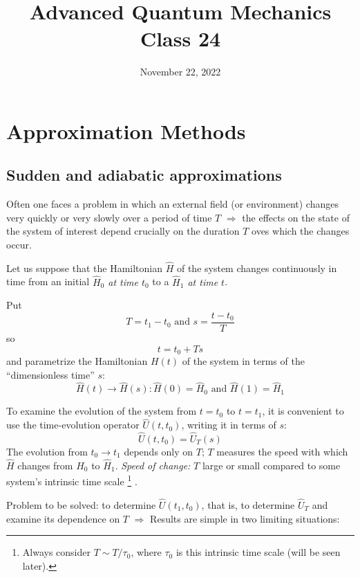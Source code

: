 \documentclass[12pt]{article}
\title{Advanced Quantum Mechanics\\Class 24}
\date{November 22, 2022}                                           %
\newcommand{\be}{\begin{equation}}
\newcommand{\ee}{\end{equation}}
\begin{document}
\maketitle

\setcounter{section}{6}

\section{Approximation Methods}


\setcounter{subsection}{2}
\subsection{Sudden and adiabatic approximations}

Often one faces a problem in which an
external field (or environment) changes
very quickly or very slowly over a
period of time $T$
$\Rightarrow$
the effects on the state of the system of
interest depend crucially on the
duration $T$ oves which the changes occur.

Let us suppose that the Hamiltonian $\hat{H}$ of the
system changes continuously in time from an
initial \emph{$\hat{H}_{0}$ at time $t_{0}$} to a \emph{$\hat{H}_{1}$ at time $t$}.

Put
\be
T=t_{1}-t_{0} \text { and } s=\frac{t-t_{0}}{T}
\ee
so
\be
t = t_0  +Ts
\ee
and parametrize the Hamiltonian $H(t)$ of the system
in terms of the ``dimensionless time'' $s$:
\be
\hat{H}(t) \rightarrow \hat{H}(s): \hat{H}(0)=\hat{H}_{0} \text{ and } \hat{H}(1)=\hat{H}_{1}
\ee


To examine the evolution of the system from $t=t_{0}$
to $t=t_{1}$, it is convenient to use the time-evolution
operator $\hat{U}\left(t, t_{0}\right)$, writing it in terms of $s$:
\be
\hat{U}\left(t, t_{0}\right)=\hat{U}_{T}(s)
\ee
The evolution from $t_{0} \rightarrow t_{1}$ depends only on $T$;
$T$ measures the speed with which $\hat{H}$ changes from $\hat{H}_{0}$ to $\hat{H}_{1}$.
\emph{Speed of change:} $T$ large or small compared to some
system's intrinsic time scale%
\footnote{Always consider $T\sim T/\tau_0$, where $\tau_0$ is this intrinsic time scale (will be seen later).}%
.

Problem to be solved: to determine $\hat{U}\left(t_{1}, t_{0}\right)$,
that is, to determine $\hat{U}_{T}$ and examine its dependence on $T$
$\Rightarrow$ Results are simple in two limiting situations:
\end{document}
